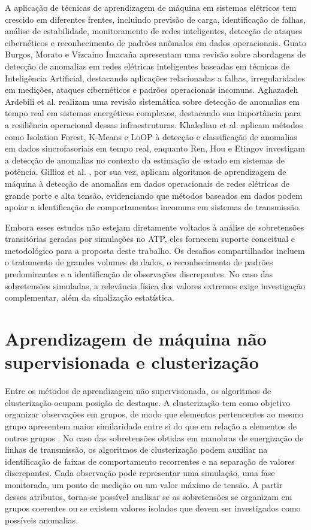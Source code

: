 \documentclass[
	12pt,				%
	openright,			%
	oneside,			%
	a4paper,			%
	chapter=TITLE,		%
	section=TITLE,		%
	subsection=TITLE,	%
	subsubsection=TITLE,%
	english,			%
	brazilian			%
	]{abntex2}
\theoremstyle{definition}
\begin{document}
A aplicação de técnicas de aprendizagem de máquina em sistemas elétricos tem crescido em diferentes frentes, incluindo previsão de carga, identificação de falhas, análise de estabilidade, monitoramento de redes inteligentes, detecção de ataques cibernéticos e reconhecimento de padrões anômalos em dados operacionais. Guato Burgos, Morato e Vizcaino Imacaña \cite{guato2024} apresentam uma revisão sobre abordagens de detecção de anomalias em redes elétricas inteligentes baseadas em técnicas de Inteligência Artificial, destacando aplicações relacionadas a falhas, irregularidades em medições, ataques cibernéticos e padrões operacionais incomuns. Aghazadeh Ardebili et al. \cite{ardebili2024} realizam uma revisão sistemática sobre detecção de anomalias em tempo real em sistemas energéticos complexos, destacando sua importância para a resiliência operacional dessas infraestruturas. Khaledian et al. \cite{khaledian2021} aplicam métodos como Isolation Forest, K-Means e LoOP à detecção e classificação de anomalias em dados sincrofasoriais em tempo real, enquanto Ren, Hou e Etingov \cite{ren2018} investigam a detecção de anomalias no contexto da estimação de estado em sistemas de potência. Gillioz et al. \cite{gillioz2026}, por sua vez, aplicam algoritmos de aprendizagem de máquina à detecção de anomalias em dados operacionais de redes elétricas de grande porte e alta tensão, evidenciando que métodos baseados em dados podem apoiar a identificação de comportamentos incomuns em sistemas de transmissão.

Embora esses estudos não estejam diretamente voltados à análise de sobretensões transitórias geradas por simulações no ATP, eles fornecem suporte conceitual e metodológico para a proposta deste trabalho. Os desafios compartilhados incluem o tratamento de grandes volumes de dados, o reconhecimento de padrões predominantes e a identificação de observações discrepantes. No caso das sobretensões simuladas, a relevância física dos valores extremos exige investigação complementar, além da sinalização estatística.

\section{Aprendizagem de máquina não supervisionada e clusterização}

Entre os métodos de aprendizagem não supervisionada, os algoritmos de clusterização ocupam posição de destaque. A clusterização tem como objetivo organizar observações em grupos, de modo que elementos pertencentes ao mesmo grupo apresentem maior similaridade entre si do que em relação a elementos de outros grupos \cite{bishop2006}. No caso das sobretensões obtidas em manobras de energização de linhas de transmissão, os algoritmos de clusterização podem auxiliar na identificação de faixas de comportamento recorrentes e na separação de valores discrepantes. Cada observação pode representar uma simulação, uma fase monitorada, um ponto de medição ou um valor máximo de tensão. A partir desses atributos, torna-se possível analisar se as sobretensões se organizam em grupos coerentes ou se existem valores isolados que devem ser investigados como possíveis anomalias.
\end{document}
